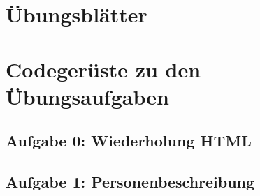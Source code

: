 \begin{appendices}
\section{Übungsblätter}
\label{app:übungsblätter}
\pagebreak


\label{pdf:ab_html_css}
\pagebreak


\label{pdf:ab_html}
\pagebreak


\label{pdf:ab_variablen_if}
\pagebreak


\label{pdf:ab_if_listen}
\pagebreak


\label{pdf:ab_funktionen}

\section{Codegerüste zu den Übungsaufgaben}
\label{app:codegerüste}

\subsection{Aufgabe 0: Wiederholung HTML}
\label{app:code0}




\subsection{Aufgabe 1: Personenbeschreibung}
\label{app:code1}


\end{appendices}
